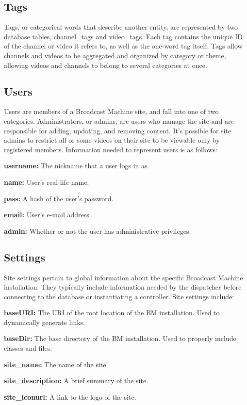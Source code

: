\documentclass[a4paper,12pt]{report}
\begin{document}
\subsection*{Tags}
Tags, or categorical words that describe another entity, are represented by two database tables, channel\_tags and video\_tags. Each tag contains the unique ID of the channel or video it refers to, as well as the one-word tag itself. Tags allow channels and videos to be aggregated and organized by category or theme, allowing videos and channels to belong to several categories at once.

\subsection*{Users}
Users are members of a Broadcast Machine site, and fall into one of two categories. Administrators, or admins, are users who manage the site and are responsible for adding, updating, and removing content. It's possible for site admins to restrict all or some videos on their site to be viewable only by registered members. Information needed to represent users is as follows:

\begin{description}
\item{\textbf{username: } The nickname that a user logs in as.}
\item{\textbf{name: } User's real-life name.}
\item{\textbf{pass: } A hash of the user's password.}
\item{\textbf{email: } User's e-mail address.}
\item{\textbf{admin: } Whether or not the user has administrative privileges.} \\
\end{description}

\subsection*{Settings}

Site settings pertain to global information about the specific Broadcast Machine installation. They typically include information needed by the dispatcher before connecting to the database or instantiating a controller. Site settings include:

\begin{description}
\item{\textbf{baseURI: } The URI of the root location of the BM installation. Used to dynamically generate links.}
\item{\textbf{baseDir: } The base directory of the BM installation. Used to properly include classes and files.}
\item{\textbf{site\_name: } The name of the site.}
\item{\textbf{site\_description: } A brief summary of the site.}
\item{\textbf{site\_iconurl: } A link to the logo of the site.} \\
\end{description}
\end{document}
